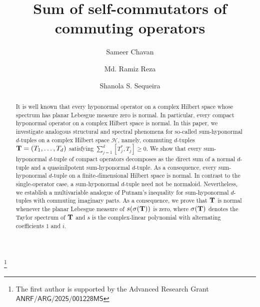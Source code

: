 \documentclass[10pt, a4paper, oneside, reqno]{amsproc}
\numberwithin{equation}{section}
\theoremstyle{remark}
\theoremstyle{definition}
\newcommand*{\Ge}{\geqslant}
\begin{document}
   \title[Sum of self-commutators]{Sum of self-commutators of commuting operators}
\author[S. Chavan]{Sameer Chavan}

\address{Department of Mathematics, IIT Kanpur, Uttar Pradesh, India -208016}


\author[Md. R. Reza]{Md. Ramiz Reza}

\address{Department of Mathematics and Statistics, Aliah University, Kolkata -700160}


\author[S. S. Sequiera]{Shanola S. Sequeira}

\address{Department of Mathematics, IIT Kanpur, Uttar Pradesh, India -208016}


\thanks{The first author is supported by the Advanced Research Grant $\mathsf{ANRF/ARG/2025/001228MS}$}


   \begin{abstract}
It is well known that every hyponormal operator on a complex Hilbert space whose spectrum has planar Lebesgue measure zero is normal. In particular, every compact hyponormal operator on a complex Hilbert space is normal. In this paper, we investigate analogous structural and spectral phenomena for so-called sum-hyponormal 
$d$-tuples on a complex Hilbert space $\mathcal H$, namely, commuting $d$-tuples ${\bf T}=(T_1, \ldots, T_d)$ satisfying
$\sum_{j=1}^d [T^*_j, T_j] \Ge 0$. 
We show that every sum-hyponormal $d$-tuple of compact operators decomposes as the direct sum of a normal $d$-tuple and a quasinilpotent sum-hyponormal $d$-tuple. As a consequence, every sum-hyponormal $d$-tuple on a finite-dimensional Hilbert space is normal. 
In contrast to the single-operator case, a sum-hyponormal $d$-tuple need not be normaloid.
Nevertheless, 
we establish a multivariable analogue of Putnam's inequality for sum-hyponormal $d$-tuples with commuting imaginary parts.
As a consequence, we prove that ${\bf T}$ is normal whenever the planar Lebesgue measure of $s(\sigma({\bf T}))$ is zero, where $\sigma({\bf T})$ denotes the Taylor spectrum of ${\bf T}$ and ${s}$ is the complex-linear polynomial with alternating coefficients $1$ and $i$.
\end{abstract}
   \maketitle
\end{document}
